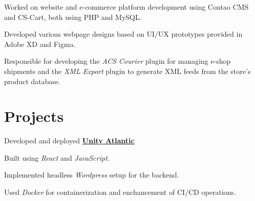 \documentclass[]{deedy-resume-reversed}
\begin{document}
\begin{minipage}[t]{0.63\textwidth}
\begin{tightemize}
\item Worked on website and e-commerce platform development using Contao CMS and CS-Cart, both using PHP and MySQL. 
\item Developed various webpage designs based on UI/UX prototypes provided in Adobe XD and Figma. 
\item Responsible for developing the \emph{ACS Courier} plugin for managing e-shop shipments and the \emph{XML Export} plugin to generate XML feeds from the store's product database.
\end{tightemize}
\sectionsep


\section{Projects}
\begin{tightemize}
\item Developed and deployed \textbf{\href{https://unityatlantic.org}{Unity Atlantic}}
\item Built using \emph{React} and \emph{JavaScript}.
\item Implemented headless \emph{Wordpress} setup for the backend.
\item Used \emph{Docker} for containerization and enchancement of CI/CD operations. 
\end{tightemize}
\sectionsep
\sectionsep

\end{minipage}
\hfill
\end{document}
